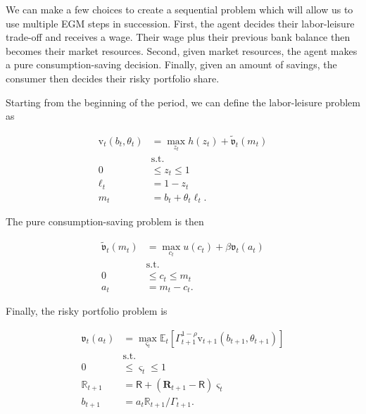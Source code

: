 \documentclass{article}
\newcommand{\DiscFac}{\beta}
\newcommand{\util}{u}
\newcommand{\tShkEmp}{\theta}
\newcommand{\Ex}{\mathbb{E}}
\newcommand{\CRRA}{\rho}
\newcommand{\h}{h}
\newcommand{\bRat}{b}
\newcommand{\leisure}{z}
\newcommand{\cRat}{c}
\newcommand{\vFunc}{\mathrm{v}}
\newcommand{\Rfree}{\mathsf{R}}
\newcommand{\riskyshare}{\varsigma}
\newcommand{\PGro}{\Gamma}
\newcommand{\labor}{\ell}
\newcommand{\aRat}{a}
\newcommand{\mRat}{m}
\newcommand{\Rport}{\mathbb{R}}
\newcommand{\Risky}{\mathbf{R}}
\newcommand{\vOpt}{\tilde{\mathfrak{v}}}
\newcommand{\vEnd}{\mathfrak{v}}
\begin{document}
We can make a few choices to create a sequential problem which will allow us to use multiple EGM steps in succession. First, the
agent decides their labor-leisure trade-off and receives a wage. Their wage
plus their previous bank balance then becomes their market resources. Second, given
market resources, the agent makes a pure consumption-saving decision. Finally, given an amount of savings, the consumer then decides their risky portfolio share.

Starting from the beginning of the period, we can define the labor-leisure problem as

\begin{equation}
\begin{split}
    \vFunc_{t}(\bRat_{t}, \tShkEmp_{t}) & = \max_{ \leisure_{t}}
    \h(\leisure_{t}) + \vOpt_{t} (\mRat_{t}) \\
    & \text{s.t.} \\
    0 & \leq \leisure_{t} \leq 1 \\
    \labor_{t} & = 1 - \leisure_{t} \\
    \mRat_{t} & = \bRat_{t} + \tShkEmp_{t}\labor_{t}.
  \end{split}
\end{equation}

The pure consumption-saving problem is then

\begin{equation}
\begin{split}
    \vOpt_{t}(\mRat_{t}) & = \max_{\cRat_{t}} \util(\cRat_{t}) + \DiscFac\vEnd_{t}(\aRat_{t}) \\
    & \text{s.t.} \\
    0 & \leq \cRat_{t} \leq \mRat_{t} \\
    \aRat_{t} & = \mRat_{t} - \cRat_{t}.
  \end{split}
\end{equation}

Finally, the risky portfolio problem is

\begin{equation}
\begin{split}
    \vEnd_{t}(\aRat_{t}) & = \max_{\riskyshare_{t}}
    \Ex_{t} \left[ \PGro_{t+1}^{1-\CRRA}
      \vFunc_{t+1}(\bRat_{t+1},
      \tShkEmp_{t+1}) \right] \\
    & \text{s.t.} \\
    0 & \leq \riskyshare_{t} \leq 1 \\
    \Rport_{t+1} & = \Rfree + (\Risky_{t+1} - \Rfree)
    \riskyshare_{t} \\
    \bRat_{t+1} & = \aRat_{t} \Rport_{t+1} / \PGro_{t+1}.
  \end{split}
\end{equation}
\end{document}
